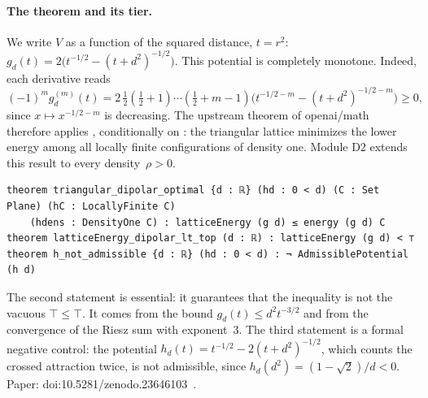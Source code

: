 \paragraph{The theorem and its tier.} We write $V$ as a function of the squared distance, $t=r^2$:
$g_d(t)=2\bigl(t^{-1/2}-(t+d^2)^{-1/2}\bigr)$. This potential is completely monotone. Indeed, each derivative
reads
\[(-1)^m g_d^{(m)}(t)=2\,\tfrac12(\tfrac12+1)\cdots(\tfrac12+m-1)\bigl(t^{-1/2-m}-(t+d^2)^{-1/2-m}\bigr)\ge0,\]
since $x\mapsto x^{-1/2-m}$ is decreasing. The upstream theorem of openai/math therefore applies \tierA{}, conditionally on
: the triangular lattice minimizes the lower energy among all
locally finite configurations of density one. Module D2 extends this result to every density~$\rho>0$.
\begin{leanbox}
\begin{lstlisting}[language=Lean]
theorem triangular_dipolar_optimal {d : ℝ} (hd : 0 < d) (C : Set Plane) (hC : LocallyFinite C)
    (hdens : DensityOne C) : latticeEnergy (g d) ≤ energy (g d) C
theorem latticeEnergy_dipolar_lt_top (d : ℝ) : latticeEnergy (g d) < ⊤
theorem h_not_admissible {d : ℝ} (hd : 0 < d) : ¬ AdmissiblePotential (h d)
\end{lstlisting}
\end{leanbox}
The second statement is essential: it guarantees that the inequality is not the vacuous $\top\le\top$. It comes from the
bound $g_d(t)\le d^2t^{-3/2}$ and from the convergence of the Riesz sum with exponent~3. The third statement
is a formal negative control: the potential $h_d(t)=t^{-1/2}-2(t+d^2)^{-1/2}$, which counts the crossed attraction
twice, is not admissible, since $h_d(d^2)=(1-\sqrt2)/d<0$. Paper:
doi:10.5281/zenodo.23646103~\cite{ch2dip}.

